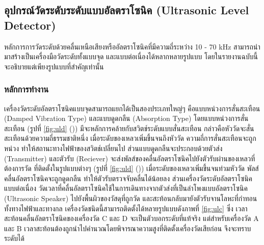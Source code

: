 \documentclass[final,11pt]{article}
\begin{document}
\subsection{อุปกรณ์วัดระดับระดับแบบอัลตราโซนิค (Ultrasonic Level Detector)}
หลักการการวัดระดับด้วยคลื่นเหนือเสียงหรืออัลตราโซนิคที่มีความถี่ระหว่าง 10 - 70 kHz สามารถนำมาสร้างเป็นเครื่องมือวัดระดับทั้งแบบจุด 
และแบบต่อเนื่องได้หลากหลายรูปแบบ โดยในรายงานฉบับนี้จะอธิบายแต่เพียงรูปแบบที่สำคัญเท่านั้น
\subsubsection{หลักการทำงาน}
เครื่องวัดระดับอัลตราโซนิคแบบจุดสามารถแยกได้เป็นสองประเภทใหญ่ๆ คือแบบหน่วงการสั่นสะเทือน (Damped Vibration Type)
และแบบดูดกลืน (Absorption Type) โดยแบบหน่วงการสั่นสะเทือน (รูปที่ \ref{fig:uld} ()) มีจะหลักการคล้ายกับสวิตช์ระดับแบบสั่นสะเทือน 
กล่าวคือหัววัดจะสั่นสะเทือนด้วยความถี่ธรรมชาติหนึ่ง เมื่อระดับของเหลวเพิ่มขึ้นจนถึงหัววัด ความถี่การสั่นสะเทือนจะถูกหน่วง ทำให้สถานะทางไฟฟ้าของสวิตช์เปลี่ยนไป 
ส่วนแบบดูดกลืนจะประกอบด้วยตัวส่ง (Transmitter) และตัวรับ (Reciever) จะส่งพัลส์ของคลื่นอัลตราโซนิคไปยังตัวรับผ่านของเหลวที่ต้องการวัด 
ที่ติดตั้งในรูปแบบต่างๆ (รูปที่ \ref{fig:uld} ()) เมื่อระดับของเหลวเพิ่มขึ้นจนท่วมหัววัด พัลส์คลื่นอัลตราโซนิคจะถูกดูดกลืน ทำให้ตัวรับตรวจจับคลื่นได้น้อยลง 
ส่วนเครื่องวัดระดับอัลตราโซนิคแบบต่อเนื่อง วัดเวลาที่คลื่นอัลตราโซนิคใช้ในการเดินทางจากตัวส่งที่เป็นลำโพงแบบอัลตราโซนิค (Ultrasonic Speaker)
ไปยังพื้นผิวของวัสดุที่ถูกวัด และสะท้อนกลับมายังตัวรับจานโลหะที่กำทอนทั้งทางไฟฟ้าและทางกล เครื่องวัดชนิดนี้สามารถติดตั้งได้หลายรูปแบบดังภาพที่ \ref{fig:ulc} ซึ่ง
เวลาสะท้อนคลื่นอัลตราโซนิคของเครื่องวัด C และ D จะเป็นตัวบอกระดับที่แท้จริง แต่สำหรับเครื่องวัด A และ B 
เวลาสะท้อนต้องถูกนำไปคำนวณโดยพิจารณาความสูงที่ติดตั้งเครื่องวัดเสียก่อน จึงจะทราบระดับได้
\end{document}
